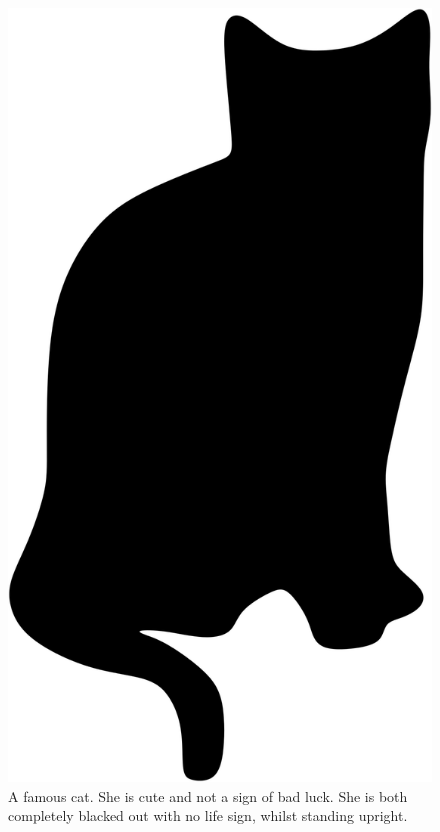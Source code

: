 \newpage

\null
\vfill

\begin{figure}[!hbpt]
    \centering
    \includegraphics{img/schroedingers_cat.png}
    \caption{A famous cat. She is cute and not a sign of bad luck. She is both completely blacked out with no life sign, whilst standing upright.}
\end{figure}

\vfill

\newpage

\phantom{}

\newpage
